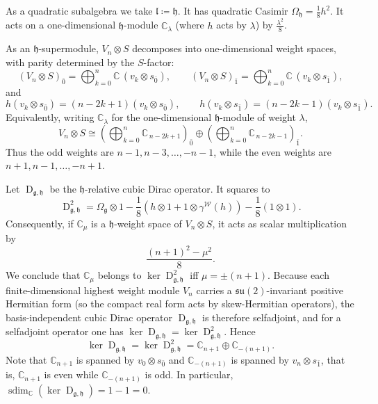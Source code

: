 \documentclass[11pt]{amsart}
\newcommand{\sdim}{\operatorname{sdim}}
\newcommand{\Dirac}{\operatorname{D}}
\def\WW{{\mathcal{W}}}
\def\CC{{\mathbb C}}
\def\hh{{\mathfrak h}}
\def\ll{{\mathfrak l}}
\def\gg{{\mathfrak{g}}}
\theoremstyle{plain}
\theoremstyle{remark}
\theoremstyle{definition}
\numberwithin{equation}{section}
\theoremstyle{remark}
\begin{document}
As a quadratic subalgebra we take $\ll\coloneqq \hh$. It has quadratic Casimir $\Omega_{\hh}=\tfrac{1}{8}h^{2}$. It acts on a one-dimensional $\hh$-module $\CC_{\lambda}$ (where $h$ acts by $\lambda$) by $\tfrac{\lambda^{2}}{8}$.

As an $\hh$-supermodule,
$V_n\otimes S$ decomposes into one-dimensional weight spaces, with parity determined by
the $S$-factor:
\begin{equation}
 (V_n\otimes S)_{\bar 0}=\bigoplus_{k=0}^n \CC\,(v_k\otimes s_{\bar 0}),\qquad
 (V_n\otimes S)_{\bar 1}=\bigoplus_{k=0}^n \CC\,(v_k\otimes s_{\bar 1}),
\end{equation}
and
\begin{equation} \label{eq::explicit_action_of_h}
 h(v_k\otimes s_{\bar 0})=(n-2k+1)(v_k\otimes s_{\bar 0}),\qquad
 h(v_k\otimes s_{\bar 1})=(n-2k-1)(v_k\otimes s_{\bar 1}).
\end{equation}
Equivalently, writing $\CC_\lambda$ for the one-dimensional $\hh$-module of weight $\lambda$,
\begin{equation}
 V_n\otimes S \cong
 \left(\bigoplus_{k=0}^n \CC_{\,n-2k+1}\right)_{\bar 0}
 \oplus
 \left(\bigoplus_{k=0}^n \CC_{\,n-2k-1}\right)_{\bar 1}.
\end{equation}
Thus the odd weights are $n-1,n-3,\dots,-n-1$, while the even weights are
$n+1,n-1,\dots,-n+1$.

Let $\Dirac_{\gg,\hh}$ be the $\hh$-relative cubic Dirac operator. It squares to 
\begin{equation}
 \Dirac_{\gg,\hh}^{2}=\Omega_{\gg} \otimes 1 - \frac{1}{8}(h\otimes 1 + 1 \otimes \gamma^{\WW}(h))-\frac{1}{8}(1\otimes 1).
\end{equation}
Consequently, if $\CC_{\mu}$ is a $\hh$-weight space of $V_{n}\otimes S$, it acts as scalar multiplication by 
\begin{equation}
 \frac{(n+1)^{2}-\mu^{2}}{8}.
\end{equation}
We conclude that $\CC_{\mu}$ belongs to $\ker \Dirac_{\gg,\hh}^{2}$ iff $\mu=\pm (n+1)$. Because each finite-dimensional highest weight module $V_n$ carries a $\mathfrak{su}(2)$-invariant positive Hermitian form (so the compact real form acts by skew-Hermitian operators), the basis-independent cubic Dirac operator $\Dirac_{\gg,\hh}$ is therefore selfadjoint, and for a selfadjoint operator one has $\ker \Dirac_{\gg,\hh}=\ker \Dirac_{\gg,\hh}^2$. Hence
\begin{equation} \label{eq::example_kernel_Dirac}
 \ker \Dirac_{\gg,\hh}=\ker \Dirac_{\gg,\hh}^{2}=\CC_{n+1} \oplus \CC_{-(n+1)}.
\end{equation}
Note that $\CC_{n+1}$ is spanned by $v_{0}\otimes s_{\bar{0}}$ and $\CC_{-(n+1)}$ is spanned by $v_{n}\otimes s_{\bar{1}}$, that is, $\CC_{n+1}$ is even while $\CC_{-(n+1)}$ is odd. In particular, $\sdim_{\CC}(\ker \Dirac_{\gg,\hh})=1-1=0$.
\end{document}

